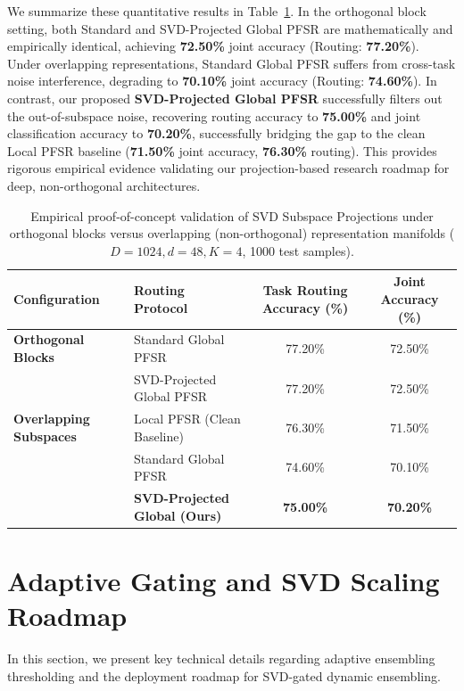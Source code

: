 \documentclass{article}
\theoremstyle{plain}
\theoremstyle{definition}
\theoremstyle{remark}
\begin{document}
We summarize these quantitative results in Table~\ref{tab:svd_projection_results}. In the orthogonal block setting, both Standard and SVD-Projected Global PFSR are mathematically and empirically identical, achieving \textbf{72.50\%} joint accuracy (Routing: \textbf{77.20\%}). 
Under overlapping representations, Standard Global PFSR suffers from cross-task noise interference, degrading to \textbf{70.10\%} joint accuracy (Routing: \textbf{74.60\%}). In contrast, our proposed \textbf{SVD-Projected Global PFSR} successfully filters out the out-of-subspace noise, recovering routing accuracy to \textbf{75.00\%} and joint classification accuracy to \textbf{70.20\%}, successfully bridging the gap to the clean Local PFSR baseline (\textbf{71.50\%} joint accuracy, \textbf{76.30\%} routing). This provides rigorous empirical evidence validating our projection-based research roadmap for deep, non-orthogonal architectures.

\begin{table}[t]
\centering
\caption{Empirical proof-of-concept validation of SVD Subspace Projections under orthogonal blocks versus overlapping (non-orthogonal) representation manifolds ($D=1024, d=48, K=4$, 1000 test samples).}
\label{tab:svd_projection_results}
\vskip 0.15in
\begin{tabular}{llcc}
\toprule
Configuration & Routing Protocol & Task Routing Accuracy (\%) & Joint Accuracy (\%) \\
\midrule
\textbf{Orthogonal Blocks} & Standard Global PFSR & 77.20\% & 72.50\% \\
& SVD-Projected Global PFSR & 77.20\% & 72.50\% \\
\midrule
\textbf{Overlapping Subspaces} & Local PFSR (Clean Baseline) & 76.30\% & 71.50\% \\
& Standard Global PFSR & 74.60\% & 70.10\% \\
& \textbf{SVD-Projected Global (Ours)} & \textbf{75.00\%} & \textbf{70.20\%} \\
\bottomrule
\end{tabular}
\end{table}

\section{Adaptive Gating and SVD Scaling Roadmap}
\label{app:limitations_and_future_work}
\label{app:svd_scaling_roadmap}

In this section, we present key technical details regarding adaptive ensembling thresholding and the deployment roadmap for SVD-gated dynamic ensembling.
\end{document}
